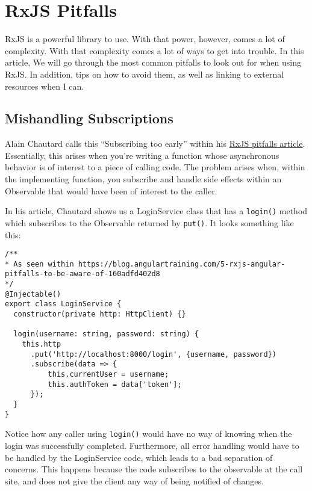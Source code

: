 \chapter{RxJS Pitfalls}

RxJS is a powerful library to use. With that power, however, comes a lot of complexity. With that complexity comes a lot of ways to get into trouble.
In this article, We will go through the most common pitfalls to look out for when using RxJS. In addition, tips on how to avoid them, as well as linking to external resources when I can.

\section{ Mishandling Subscriptions}
Alain Chautard calls this “Subscribing too early” within his \href{blog.angulartraining.com/5-rxjs-angular-pitfalls-to-be-aware-of-160adfd402d8}{RxJS pitfalls article}. Essentially, this arises when you’re writing a function whose asynchronous behavior is of interest to a piece of calling code. The problem arises when, within the implementing function, you subscribe and handle side effects within an Observable that would have been of interest to the caller.

In his article, Chautard shows us a LoginService class that has a \lstinline{login()} method which subscribes to the Observable returned by \lstinline{put()}. It looks something like this:

\begin{lstlisting}
/**
* As seen within https://blog.angulartraining.com/5-rxjs-angular-pitfalls-to-be-aware-of-160adfd402d8
*/
@Injectable()
export class LoginService {
  constructor(private http: HttpClient) {}

  login(username: string, password: string) {
    this.http
      .put('http://localhost:8000/login', {username, password})
      .subscribe(data => {
          this.currentUser = username;
          this.authToken = data['token'];
      });
  }
}  
\end{lstlisting}

Notice how any caller using \lstinline{login()} would have no way of knowing when the login was successfully completed. Furthermore, all error handling would have to be handled by the LoginService code, which leads to a bad separation of concerns. This happens because the code subscribes to the observable at the call site, and does not give the client any way of being notified of changes.

